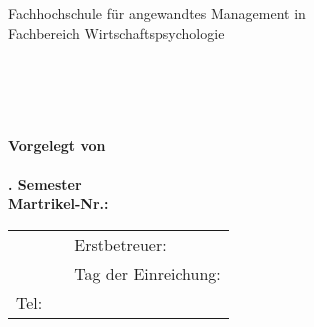 \begin{titlepage}
	\noindent
	Fachhochschule für angewandtes Management in \myCampus\\
	Fachbereich Wirtschaftspsychologie\\
	\mySemDate \\%
	\begin{center}
		\vspace*{2cm}
		\Large\rm\myProjectType\\
		\vspace*{0.5cm}
		\LARGE\bf\myTopic\\
		\Large\rm\mySubTopic\\
		\vspace*{2cm}
		\large
		Vorgelegt von \\ \myAutor\\
		\mySemester. Semester\\
		Martrikel-Nr.: \myMarikelnummer
		\vspace*{4cm}
	\end{center}
	
	\noindent
	\begin{tabularx}{\linewidth}{lXl}
		\myStreet             				&& Erstbetreuer: \myDoz 								\\
		\myCity 	  						 && Tag der Einreichung: \myEndDate               \\  		
		Tel: \myTel           				 &&																	  \\
	\end{tabularx} 

	\vfill
\end{titlepage}
\newpage
\setcounter{page}{2}